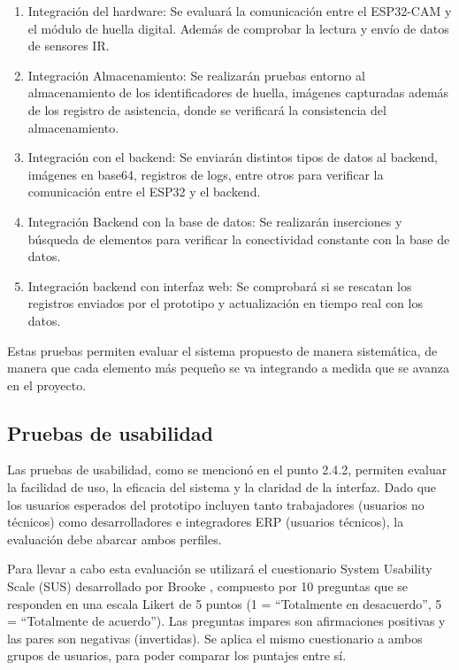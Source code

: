 \documentclass{iccmemoria}
\begin{document}
\begin{enumerate}
    \item Integración del hardware: Se evaluará la comunicación entre el ESP32-CAM y el módulo de huella digital. Además de comprobar la lectura y envío de datos de sensores IR.
    \item Integración Almacenamiento: Se realizarán pruebas entorno al almacenamiento de los identificadores de huella, imágenes capturadas además de los registro de asistencia, donde se verificará la consistencia del almacenamiento.
    \item Integración con el backend: Se enviarán distintos tipos de datos al backend, imágenes en base64, registros de logs, entre otros para verificar la comunicación entre el ESP32 y el backend.
    \item Integración Backend con la base de datos: Se realizarán inserciones y búsqueda de elementos para verificar la conectividad constante con la base de datos.
    \item Integración backend con interfaz web: Se comprobará si se rescatan los registros enviados por el prototipo y actualización en tiempo real con los datos.
\end{enumerate}

Estas pruebas permiten evaluar el sistema propuesto de manera sistemática, de manera que cada elemento más pequeño se va integrando a medida que se avanza en el proyecto.

\subsection{Pruebas de usabilidad}
Las pruebas de usabilidad, como se mencionó en el punto 2.4.2, permiten evaluar la facilidad de uso, la eficacia del sistema y la claridad de la interfaz. Dado que los usuarios esperados del prototipo incluyen tanto trabajadores (usuarios no técnicos) como desarrolladores e integradores ERP (usuarios técnicos), la evaluación debe abarcar ambos perfiles.

Para llevar a cabo esta evaluación se utilizará el cuestionario System Usability Scale (SUS) desarrollado por Brooke \cite{brooke1996}, compuesto por 10 preguntas que se responden en una escala Likert de 5 puntos (1 = ``Totalmente en desacuerdo'', 5 = ``Totalmente de acuerdo''). Las preguntas impares son afirmaciones positivas y las pares son negativas (invertidas). Se aplica el mismo cuestionario a ambos grupos de usuarios, para poder comparar los puntajes entre sí.
\end{document}
